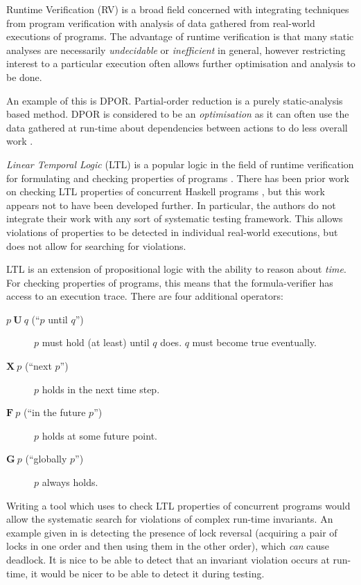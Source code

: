Runtime Verification (RV) is a broad field concerned with integrating
techniques from program verification with analysis of data gathered
from real-world executions of programs. The advantage of runtime
verification is that many static analyses are necessarily
\emph{undecidable} or \emph{inefficient} in general, however
restricting interest to a particular execution often allows further
optimisation and analysis to be done.

An example of this is DPOR. Partial-order reduction is a purely
static-analysis based method. DPOR is considered to be an
\emph{optimisation} as it can often use the data gathered at run-time
about dependencies between actions to do less overall work
\citep{dpor}.

\emph{Linear Temporal Logic} (LTL) is a popular logic in the field of
runtime verification for formulating and checking properties of
programs \citep{ltl}. There has been prior work on checking LTL
properties of concurrent Haskell programs \citep{hsrv}, but this work
appears not to have been developed further. In particular, the authors
do not integrate their work with any sort of systematic testing
framework. This allows violations of properties to be detected in
individual real-world executions, but does not allow for searching for
violations.

LTL is an extension of propositional logic with the ability to reason
about \emph{time}. For checking properties of programs, this means
that the formula-verifier has access to an execution trace. There are
four additional operators:

\begin{description}
\item[$p~\mathbf{U}~q$ (``$p$ until $q$'')] $p$ must hold (at least)
  until $q$ does. $q$ must become true eventually.

\item[$\mathbf{X}~p$ (``next $p$'')] $p$ holds in the next time step.

\item[$\mathbf{F}~p$ (``in the future $p$'')] $p$ holds at some future
  point.

\item[$\mathbf{G}~p$ (``globally $p$'')] $p$ always holds.
\end{description}

Writing a tool which uses \dejafu{} to check LTL properties of
concurrent programs would allow the systematic search for violations
of complex run-time invariants. An example given in \citep{hsrv} is
detecting the presence of lock reversal (acquiring a pair of locks in
one order and then using them in the other order), which \emph{can}
cause deadlock. It is nice to be able to detect that an invariant
violation occurs at run-time, it would be nicer to be able to detect
it during testing.

